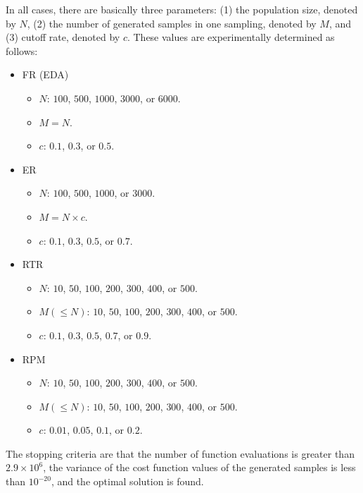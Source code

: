 In all cases, there are basically three parameters:
(1) the population size, denoted by $N$,
(2) the number of generated samples in one sampling, denoted by $M$, and
(3) cutoff rate, denoted by $c$.
These values are experimentally determined as follows:
{
\begin{itemize}
\item FR (EDA)
\begin{itemize}
\item $N$: $100$, $500$, $1000$, $3000$, or $6000$.
\item $M=N$.
\item $c$: $0.1$, $0.3$, or $0.5$.
\end{itemize}
\item ER
\begin{itemize}
\item $N$: $100$, $500$, $1000$, or $3000$.
\item $M=N \times c$.
\item $c$: $0.1$, $0.3$, $0.5$, or $0.7$.
\end{itemize}
\item RTR
\begin{itemize}
\item $N$: $10$, $50$, $100$, $200$, $300$, $400$, or $500$.
\item $M(\leq N)$: $10$, $50$, $100$, $200$, $300$, $400$, or $500$.
\item $c$: $0.1$, $0.3$, $0.5$, $0.7$, or $0.9$.
\end{itemize}
\item RPM
\begin{itemize}
\item $N$: $10$, $50$, $100$, $200$, $300$, $400$, or $500$.
\item $M(\leq N)$: $10$, $50$, $100$, $200$, $300$, $400$, or $500$.
\item $c$: $0.01$, $0.05$, $0.1$, or $0.2$.
\end{itemize}
\end{itemize}
}
The stopping criteria are that the number of function evaluations
is greater than $2.9\times10^6$, 
the variance of the cost function values
of the generated samples is less than $10^{-20}$,
and the optimal solution is found.


